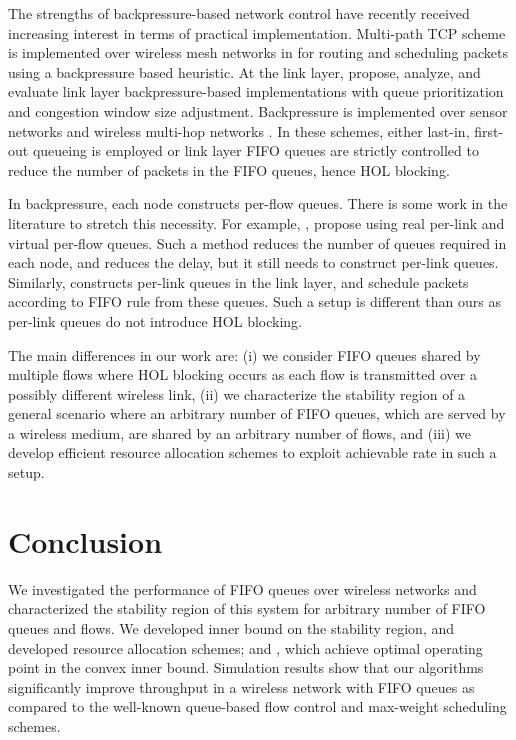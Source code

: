 \documentclass[conference]{IEEEtran}
\begin{document}
The strengths of backpressure-based network control have recently received increasing interest in terms of practical implementation. Multi-path TCP scheme is implemented over wireless mesh networks in \cite{horizon} for routing and scheduling packets using a backpressure based heuristic. At the link layer, \cite{DiffQ,umut_stolyar,sridharan2} propose, analyze, and evaluate link layer backpressure-based implementations with queue prioritization and congestion window size adjustment. Backpressure is implemented over sensor networks \cite{routing_wtht_routes} and wireless multi-hop networks \cite{xpress}. In these schemes, either last-in, first-out queueing is employed \cite{routing_wtht_routes} or link layer FIFO queues are strictly controlled \cite{xpress} to reduce the number of packets in the FIFO queues, hence HOL blocking.

In backpressure, each node constructs per-flow queues. There is some work in the literature to stretch this necessity. For example, \cite{pkt_by_pkt_adap_rout}, \cite{locbui} propose using real per-link and virtual per-flow queues. Such a method reduces the number of queues required in each node, and reduces the delay, but it still needs to construct per-link queues. Similarly, \cite{diffmax} constructs per-link queues in the link layer, and schedule packets according to FIFO rule from these queues. Such a setup is different than ours as per-link queues do not introduce HOL blocking. 

The main differences in our work are: (i) we consider FIFO queues shared by multiple flows where HOL blocking occurs as each flow is transmitted over a possibly different wireless link, (ii) we characterize the stability region of a general scenario where an arbitrary number of FIFO queues, which are served by a wireless medium, are shared by an arbitrary number of flows, and (iii) we develop efficient resource allocation schemes to exploit achievable rate in such a setup. 


\section{Conclusion}\label{sec:conclusion}
We investigated the performance of FIFO queues over wireless networks and characterized the stability region of this system for arbitrary number of FIFO queues and flows. We developed inner bound on the stability region, and developed resource allocation schemes;  and , which achieve optimal operating point in the convex inner bound. Simulation results show that our algorithms significantly improve throughput in a wireless network with FIFO queues as compared to the well-known queue-based flow control and max-weight scheduling schemes.
\end{document}
